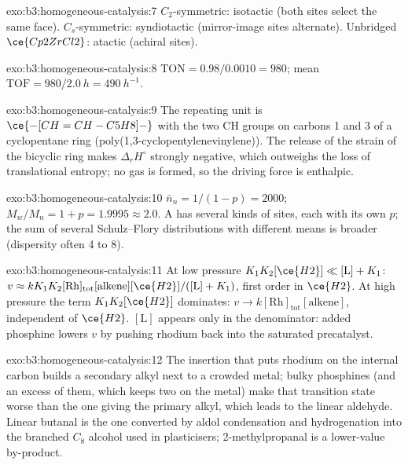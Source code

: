 \begin{solution}{exo:b3:homogeneous-catalysis:7}
$C_2$-symmetric: isotactic (both sites select the same face). $C_s$-symmetric:
syndiotactic (mirror-image sites alternate). Unbridged $\ce{Cp2ZrCl2}$: atactic (achiral
sites).
\end{solution}

\begin{solution}{exo:b3:homogeneous-catalysis:8}
$\mathrm{TON} = 0.98/0.0010 = 980$; mean $\mathrm{TOF} = 980/\qty{2.0}{h} = \qty{490}{h^{-1}}$.
\end{solution}

\begin{solution}{exo:b3:homogeneous-catalysis:9}
The repeating unit is $\ce{-[CH=CH-C5H8]-}$ with the two CH groups on carbons 1 and 3 of a
cyclopentane ring (poly(1,3-cyclopentylenevinylene)). The release of the
strain of the bicyclic ring makes $\Delta_rH^\circ$ strongly negative, which outweighs the
loss of translational entropy; no gas is formed, so the driving force is
enthalpic.
\end{solution}

\begin{solution}{exo:b3:homogeneous-catalysis:10}
$\bar n_n = 1/(1 - p) = 2000$; $M_w/M_n = 1 + p = 1.9995 \approx 2.0$. A  has
several kinds of sites, each with its own $p$; the sum of several Schulz--Flory
distributions with different means is broader (dispersity often 4 to 8).
\end{solution}

\begin{solution}{exo:b3:homogeneous-catalysis:11}
At low pressure $K_1K_2[\ce{H2}] \ll [\mathrm L] + K_1$: $v \approx kK_1K_2[\mathrm{Rh}]_{\mathrm{tot}}[\text{alkene}][\ce{H2}]/([\mathrm L] + K_1)$,
first order in $\ce{H2}$. At high pressure the term $K_1K_2[\ce{H2}]$ dominates: $v \to k[\mathrm{Rh}]_{\mathrm{tot}}[\text{alkene}]$,
independent of $\ce{H2}$. $[\mathrm L]$ appears only in the denominator: added phosphine lowers $v$
by pushing rhodium back into the saturated precatalyst.
\end{solution}

\begin{solution}{exo:b3:homogeneous-catalysis:12}
The insertion that puts rhodium on the internal carbon builds a secondary alkyl
next to a crowded metal; bulky phosphines (and an excess of them, which keeps two
on the metal) make that transition state worse than the one giving the primary
alkyl, which leads to the linear aldehyde. Linear butanal is the one converted by
aldol condensation and hydrogenation into the branched $C_8$ alcohol used in
plasticisers; 2-methylpropanal is a lower-value by-product.
\end{solution}

